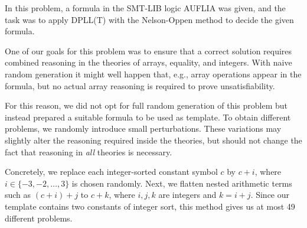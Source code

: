 In this problem, a formula in the SMT-LIB logic AUFLIA was given,
and the task was to apply DPLL(T) with the Nelson-Oppen method
to decide the given formula.

One of our goals for this problem was to ensure that a correct solution
requires combined reasoning in the theories of arrays, equality, and integers.
With naive random generation it might well happen that,
e.g., array operations appear in the formula,
but no actual array reasoning is required to prove unsatisfiability.


For this reason,
we did not opt for full random generation of this problem
but instead prepared a suitable formula to be used as template.
To obtain different problems,
we randomly introduce small perturbations.
These variations may slightly alter the reasoning required inside the theories,
but should not change the fact that reasoning in \emph{all} theories is necessary.

Concretely, we replace each integer-sorted constant symbol $c$ by $c+i$,
where $i \in \{-3,-2,\dots,3\}$ is chosen randomly.
Next, we flatten nested arithmetic terms such as $(c+i)+j$ to $c+k$,
where $i,j,k$ are integers and $k = i+j$.
Since our template contains two constants of integer sort,
this method gives us at most 49 different problems.

